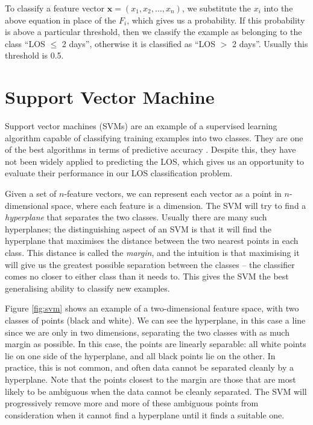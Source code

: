 To classify a feature vector $\mathbf{x} = (x_1,x_2,\ldots,x_n)$, we substitute the
$x_i$ into the above equation in place of the $F_i$, which gives us a
probability. If this probability is above a particular threshold, then we
classify the example as belonging to the class ``LOS $\leq$ 2 days'', otherwise
it is classified as ``LOS $>$ 2 days''. Usually this threshold is 0.5.

\section{Support Vector Machine}
Support vector machines (SVMs) are an example of a supervised learning algorithm
capable of classifying training examples into two classes. They are one of the
best algorithms in terms of predictive accuracy \cite{Bellazzi2008}. Despite
this, they have not been widely applied to predicting the LOS, which gives us
an opportunity to evaluate their performance in our LOS classification problem.

Given a set of $n$-feature vectors, we can represent each vector as a point in
$n$-dimensional space, where each feature is a dimension. The SVM will try to
find a \textit{hyperplane} that separates the two classes. Usually there are
many such hyperplanes; the distinguishing aspect of an SVM is that it will
find the hyperplane that maximises the distance between the two nearest points
in each class. This distance is called the \textit{margin}, and the intuition
is that maximising it will give us the greatest possible separation between the
classes -- the classifier comes no closer to either class than it needs to.
This gives the SVM the best generalising ability to classify new examples.

Figure \ref{fig:svm} shows an example of a two-dimensional feature space, with
two classes of points (black and white). We can see the hyperplane, in this
case a line since we are only in two dimensions, separating the two classes
with as much margin as possible. In
this case, the points are linearly separable: all white points lie on one side
of the hyperplane, and all black points lie on the other. In practice, this is
not common, and often data cannot be separated cleanly by a hyperplane.
Note that the points closest to the margin are those that are most likely to be
ambiguous when the data cannot be cleanly separated. The SVM will progressively
remove more and more of these ambiguous points from consideration when it
cannot find a hyperplane until it finds a suitable one.


